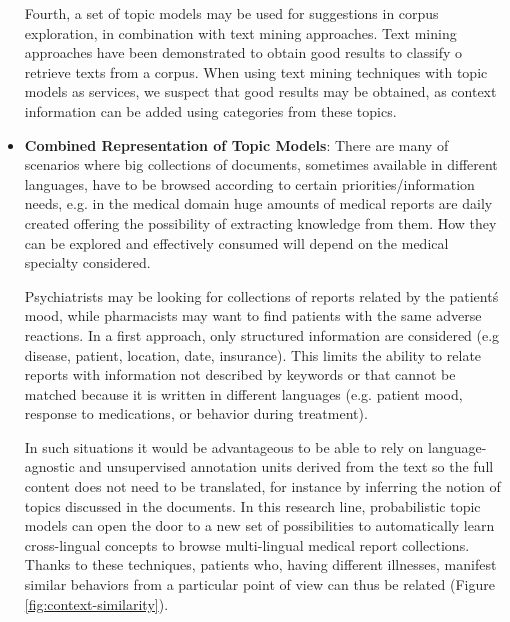 \begin{itemize}
Fourth, a set of topic models may be used for suggestions in corpus exploration, in combination with text mining approaches. Text mining approaches have been demonstrated to obtain good results to classify o retrieve texts from a corpus. When using text mining techniques with topic models as services, we suspect that good results may be obtained, as context information can be added using categories from these topics. 
\item \textbf{Combined Representation of Topic Models}: There are many of scenarios where big collections of documents, sometimes available in different languages, have to be browsed according to certain priorities/information needs, e.g. in the medical domain huge amounts of medical reports are daily created offering the possibility of extracting knowledge from them. How they can be explored and effectively consumed will depend on the medical specialty considered. 

Psychiatrists may be looking for collections of reports related by the patient\'s mood, while pharmacists may want to find patients with the same adverse reactions. In a first approach, only structured information are considered (e.g disease, patient, location, date, insurance). This limits the ability to relate reports with information not described by keywords or that cannot be matched because it is written in different languages (e.g. patient mood, response to medications, or behavior during treatment). 

In such situations it would be advantageous to be able to rely on language-agnostic and unsupervised annotation units derived from the text so the full content does not need to be translated, for instance by inferring the notion of topics discussed in the documents. In this research line, probabilistic topic models can open the door to a new set of possibilities to automatically learn cross-lingual concepts to browse multi-lingual medical report collections. Thanks to these techniques, patients who, having different illnesses, manifest similar behaviors from a particular point of view can thus be related (Figure \ref{fig:context-similarity}). 


\end{itemize}
